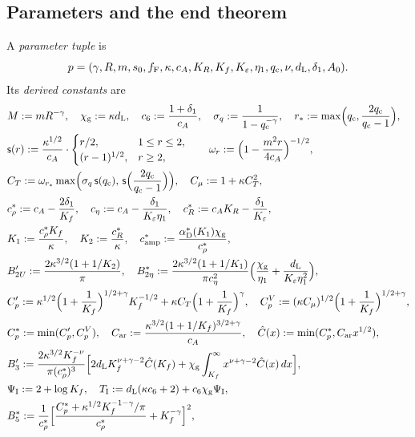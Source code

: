 \subsection{Parameters and the end theorem}

\begin{definition}[Parameters]\label{def:param}
A \emph{parameter tuple} is
\[
p=(\gamma,R,m,s_0,f_{\mathrm F},\kappa,c_A,K_R,K_f,K_\varepsilon,\eta_1,q_{\mathrm c},\nu,d_{\mathrm L},\delta_1,A_0).
\]
Its \emph{derived constants} are
\begingroup\allowdisplaybreaks
\begin{align*}
&M:=mR^{-\gamma},\quad \chig:=\kappa\dL,\quad c_6:=\frac{1+\delta_1}{c_A},\quad \sigma_q:=\frac1{1-\qc^{-\gamma}},\quad
r_*:=\max\Bigl(\qc,\frac{2\qc}{\qc-1}\Bigr),\\
&\mathsf s(r):=\frac{\kappa^{1/2}}{c_A}\cdot\begin{cases}r/2,&1\le r\le2,\\(r-1)^{1/2},&r\ge2,\end{cases}\qquad
\omega_r:=\Bigl(1-\frac{m^2r}{4c_A}\Bigr)^{-1/2},\\
&\CT:=\omega_{r_*}\max\Bigl(\sigma_q\,\mathsf s(\qc),\,\mathsf s\Bigl(\frac{2\qc}{\qc-1}\Bigr)\Bigr),\quad \Cmu:=1+\kappa\CT^2,\\
&c_\rho^*:=c_A-\frac{2\delta_1}{K_f},\quad c_\eta:=c_A-\frac{\delta_1}{\Keps\eta_1},\quad c_R^*:=c_AK_R-\frac{\delta_1}{\Keps},\\
&K_1:=\frac{c_\rho^*K_f}{\kappa},\quad K_2:=\frac{c_R^*}{\kappa},\quad \camp:=\frac{\aD(K_1)\chig}{c_\rho^*},\\
&B_{2U}':=\frac{2\kappa^{3/2}(1+1/K_2)}{\pi},\quad
B_{2\eta}^*:=\frac{2\kappa^{3/2}(1+1/K_1)}{\pi c_\eta^2}\Bigl(\frac{\chig}{\eta_1}+\frac{\dL}{\Keps\eta_1^2}\Bigr),\\
&C_p':=\kappa^{1/2}\Bigl(1+\frac1{K_f}\Bigr)^{1/2+\gamma}K_f^{-1/2}+\kappa\CT\Bigl(1+\frac1{K_f}\Bigr)^\gamma,\quad
C_p^V:=(\kappa\Cmu)^{1/2}\Bigl(1+\frac1{K_f}\Bigr)^{1/2+\gamma},\\
&C_p^*:=\min(C_p',C_p^V),\quad C_{\mathrm{ar}}:=\frac{\kappa^{3/2}(1+1/K_f)^{3/2+\gamma}}{c_A},\quad
\hat C(x):=\min(C_p^*,C_{\mathrm{ar}}x^{1/2}),\\
&B_3':=\frac{2\kappa^{3/2}K_f^{-\nu}}{\pi(c_\rho^*)^3}\Bigl[2\dL K_f^{\nu+\gamma-2}\hat C(K_f)+\chig\int_{K_f}^\infty x^{\nu+\gamma-2}\hat C(x)\,dx\Bigr],\\
&\PsiI:=2+\log K_f,\quad\TI:=\dL(\kappa c_6+2)+c_6\chig\PsiI,\\
&B_5^*:=\frac1{c_\rho^*}\Bigl[\frac{C_p^*+\kappa^{1/2}K_f^{-1-\gamma}/\pi}{c_\rho^*}+K_f^{-\gamma}\Bigr]^2,\quad

\end{align*}
\end{definition}
